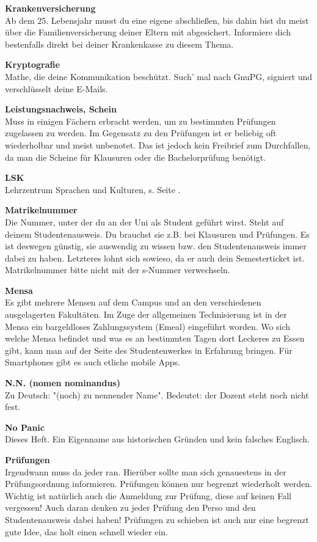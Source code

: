 \textbf{Krankenversicherung} \\
Ab dem 25. Lebensjahr musst du eine eigene abschließen, bis dahin bist du meist über die Familienversicherung deiner Eltern mit abgesichert.
Informiere dich bestenfalls direkt bei deiner Krankenkasse zu diesem Thema.

\textbf{Kryptografie} \\
Mathe, die deine Kommunikation beschützt.
Such' mal nach GnuPG, signiert und verschlüsselt deine E-Mails.

\textbf{Leistungsnachweis, Schein} \\
Muss in einigen Fächern erbracht werden, um zu bestimmten Prüfungen zugelassen zu werden.
Im Gegensatz zu den Prüfungen ist er beliebig oft wiederholbar und meist unbenotet.
Das ist jedoch kein Freibrief zum Durchfallen, da man die Scheine für Klausuren oder die Bachelorprüfung benötigt.

\textbf{LSK} \\
Lehrzentrum Sprachen und Kulturen, s. Seite \pageref{sec:sprachausbildung}.

\textbf{Matrikelnummer} \\
Die Nummer, unter der du an der Uni als Student geführt wirst.
Steht auf deinem Studentenausweis.
Du brauchst sie z.B. bei Klausuren und Prüfungen.
Es ist deswegen günstig, sie auswendig zu wissen bzw. den Studentenausweis immer dabei zu haben.
Letzteres lohnt sich sowieso, da er auch dein Semesterticket ist.
Matrikelnummer bitte nicht mit der s-Nummer verwechseln.

\textbf{Mensa} \\
Es gibt mehrere Mensen auf dem Campus und an den verschiedenen ausgelagerten Fakultäten.
Im Zuge der allgemeinen Technisierung ist in der Mensa ein bargeldloses Zahlungssystem (Emeal) eingeführt worden.
Wo sich welche Mensa befindet und was es an bestimmten Tagen dort Leckeres zu Essen gibt, kann man auf der Seite des Studentenwerkes in Erfahrung bringen.
Für Smartphones gibt es auch etliche mobile Apps.

\textbf{N.N. (nomen nominandus)} \\
Zu Deutsch:
"(noch) zu nennender Name".
Bedeutet:
der Dozent steht noch nicht fest.

\textbf{No Panic} \\
Dieses Heft.
Ein Eigenname aus historischen Gründen und kein falsches Englisch.

\textbf{Prüfungen} \\
Irgendwann muss da jeder ran.
Hierüber sollte man sich genauestens in der Prüfungsordnung informieren.
Prüfungen können nur begrenzt wiederholt werden.
Wichtig ist natürlich auch die Anmeldung zur Prüfung, diese auf keinen Fall vergessen!
Auch daran denken zu jeder Prüfung den Perso und den Studentenausweis dabei haben!
Prüfungen zu schieben ist auch nur eine begrenzt gute Idee, das holt einen schnell wieder ein.

